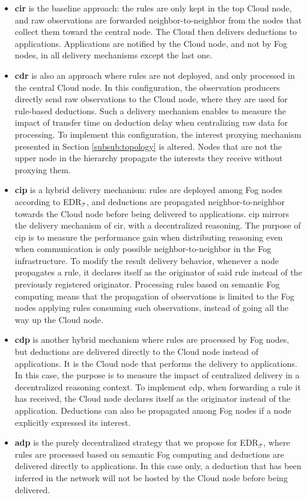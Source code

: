 \documentclass[sw]{iosart2x}
\newcommand{\edrt}{EDR$_{\mathcal{T}}$\xspace}
\begin{document}
\begin{itemize}
	\item \textbf{\gls{cir}} is the baseline approach: the rules are only kept in the top Cloud node, and raw observations are forwarded neighbor-to-neighbor from the nodes that collect them toward the central node. 
	The Cloud then delivers deductions to applications. 
	Applications are notified by the Cloud node, and not by Fog nodes, in all delivery mechanisms except the last one.
	
	\item \textbf{\gls{cdr}} is also an approach where rules are not deployed, and only processed in the central Cloud node. 
	In this configuration, the observation producers directly send raw observations to the Cloud node, where they are used for rule-based deductions.
	Such a delivery mechanism enables to measure the impact of transfer time on deduction delay when centralizing raw data for processing.
	To implement this configuration, the interest proxying mechanism presented in Section \textsection \ref{subsub:topology} is altered. 
	Nodes that are not the upper node in the hierarchy propagate the interests they receive without proxying them.
	
	\item \textbf{\gls{cip}} is a hybrid delivery mechanism: rules are deployed among Fog nodes according to \edrt, and deductions are propagated neighbor-to-neighbor towards the Cloud node before being delivered to applications. 
	\gls{cip} mirrors the delivery mechanism of \gls{cir}, with a decentralized reasoning.
	The purpose of \gls{cip} is to measure the performance gain when distributing reasoning even when communication is only possible neighbor-to-neighbor in the Fog infrastructure.
	To modify the result delivery behavior, whenever a node propagates a rule, it declares itself as the originator of said rule instead of the previously registered originator.
	Processing rules based on semantic Fog computing means that the propagation of observations is limited to the Fog nodes applying rules consuming such observations, instead of going all the way up the Cloud node.
	
	\item \textbf{\gls{cdp}} is another hybrid mechanism where rules are processed by Fog nodes, but deductions are delivered directly to the Cloud node instead of applications.
	It is the Cloud node that performs the delivery to applications.
	In this case, the purpose is to measure the impact of centralized delivery in a decentralized reasoning context.
	To implement \gls{cdp}, when forwarding a rule it has received, the Cloud node declares itself as the originator instead of the application.
	Deductions can also be propagated among Fog nodes if a node explicitly expressed its interest.
	
	\item \textbf{\gls{adp}} is the purely decentralized strategy that we propose for \edrt, where rules are processed based on semantic Fog computing and deductions are delivered directly to applications. 
	In this case only, a deduction that has been inferred in the network will not be hosted by the Cloud node before being delivered.
\end{itemize}
\end{document}
